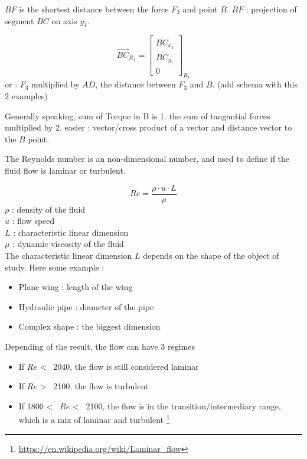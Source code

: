 \documentclass[12pt,a4paper]{article}
\begin{document}
	$\overline{B F}$ is the shortest distance between the force $F_3$ and point $B$.
	$\overline{B F}$ : projection of segment $\overline{BC}$ on axis $y_1$. 
	
	\begin{equation}
		\vec{BC}_{R_{1}}=
		\begin{bmatrix}
			\overline{BC}_{x_1} \\
			\overline{BC}_{y_1}\\
			0
		\end{bmatrix}_{R_{1}} 
	\end{equation}
	or : $F_3$ multiplied by $AD$, the distance between $F_3$ and $B$. (add schema with this 2 examples)
	
	Generally speaking, sum of Torque in B is 
	1. the sum of tangantial forces multiplied by
	2. easier : vector/cross product of a vector and distance vector to the $B$ point.  
	
	The Reynolds number is an non-dimensional number, and used to define if the fluid flow is laminar or turbulent. 
	
	\begin{equation}
		Re = \frac{\rho \cdot u \cdot L}{\mu}
	\end{equation}
	$\rho$ : density of the fluid\\
	$u$ : flow speed\\
	$L$ : characteristic linear dimension\\
	$\mu$ : dynamic viscosity of the fluid\\
	
	The characteristic linear dimension $L$ depends on the shape of the object of study. Here some example : 
	\begin{itemize}
		\item Plane wing : length of the wing
		\item Hydraulic pipe : diameter of the pipe
		\item Complex shape : the biggest dimension
	\end{itemize}
	Depending of the result, the flow can have 3 regimes
	
	\begin{itemize}
		\item If $Re$ <~ 2040, the flow is still considered laminar 
		\item If $Re$ >~ 2100, the flow is turbulent
		\item If 1800 <~ $Re$ <~ 2100, the flow is in the transition/intermediary range, which is a mix of laminar and turbulent \footnote{\url{https://en.wikipedia.org/wiki/Laminar_flow}}
	\end{itemize}
	
\end{document}
